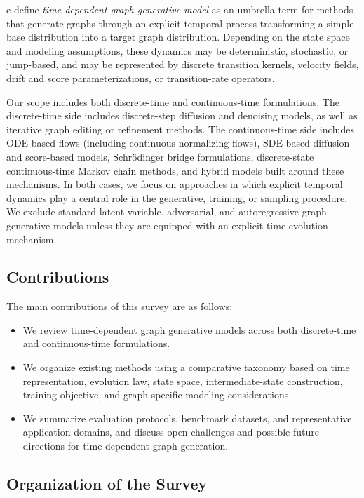 \documentclass{article}
\begin{document}
e define \emph{time-dependent graph generative model} as an umbrella term for methods that generate graphs through an explicit temporal process transforming a simple base distribution into a target graph distribution. Depending on the state space and modeling assumptions, these dynamics may be deterministic, stochastic, or jump-based, and may be represented by discrete transition kernels, velocity fields, drift and score parameterizations, or transition-rate operators.

Our scope includes both discrete-time and continuous-time formulations. The discrete-time side includes discrete-step diffusion and denoising models, as well as iterative graph editing or refinement methods. The continuous-time side includes ODE-based flows (including continuous normalizing flows), SDE-based diffusion and score-based models, Schr\"odinger bridge formulations, discrete-state continuous-time Markov chain methods, and hybrid models built around these mechanisms. In both cases, we focus on approaches in which explicit temporal dynamics play a central role in the generative, training, or sampling procedure. We exclude standard latent-variable, adversarial, and autoregressive graph generative models unless they are equipped with an explicit time-evolution mechanism.

\subsection{Contributions}
\label{sec:contributions}

The main contributions of this survey are as follows:
\begin{itemize}[leftmargin=*]
    \item We review time-dependent graph generative models across both discrete-time and continuous-time formulations.
    \item We organize existing methods using a comparative taxonomy based on time representation, evolution law, state space, intermediate-state construction, training objective, and graph-specific modeling considerations.
    \item We summarize evaluation protocols, benchmark datasets, and representative application domains, and discuss open challenges and possible future directions for time-dependent graph generation.
\end{itemize}

\subsection{Organization of the Survey}
\label{sec:organization}
\end{document}

